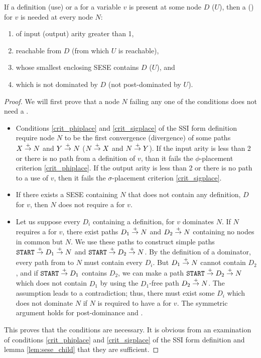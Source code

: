 \documentclass[12pt,titlepage,twoside]{article}
\begin{document}
\begin{lemma}\label{lem:ssi_dom}
If a definition (use) or a \phisigfunction[or]{} for a variable $v$ is
present at some node $D$ (\/$U$), then a \phifunction (\sigfunction) for
$v$ is needed at every node $N$:
\begin{enumerate}
\item of input (output) arity greater than 1,
\item reachable from $D$ (from which $U$ is reachable),
\item whose smallest enclosing SESE contains $D$ (\/$U$), and
\item which is not dominated by $D$ (not post-dominated by $U$).
\end{enumerate}
\end{lemma}
\begin{proof}
We will first prove that a node $N$ failing any one of the conditions does
not need a \phisigfunction[or].
\begin{itemize}
\item Conditions \ref{crit_phiplace} and \ref{crit_sigplace} of the
SSI form definition require node $N$ to be the first convergence
(divergence) of some paths $X \stackrel{+}{\rightarrow} N$ and $Y \stackrel{+}{\rightarrow} N$ ($N
\stackrel{+}{\rightarrow} X$ and $N \stackrel{+}{\rightarrow} Y$).  If the input arity is less than 2
or there is no path from a definition of $v$, than it fails the
$\phi$-placement criterion \ref{crit_phiplace}.  If the output arity
is less than 2 or there is no path to a use of $v$, then it fails the
$\sigma$-placement criterion \ref{crit_sigplace}.
\item If there exists a SESE containing $N$ that does not contain any
definition, \phisigfunction[or]{} $D$ for $v$, then $N$ does not require a
\phisigfunction[or]{} for $v$.
\item Let us suppose every $D_i$ containing a definition,
\phisigfunction[or]{} for $v$ dominates $N$.  If $N$ requires a
\phifunction for $v$,  there exist paths $D_1 \stackrel{+}{\rightarrow} N$ and
$D_2 \stackrel{+}{\rightarrow} N$ containing no nodes in common but $N$.  We use these
paths to construct simple paths $\texttt{START}\stackrel{+}{\rightarrow} D_1 \stackrel{+}{\rightarrow} N$ and
$\texttt{START}\stackrel{+}{\rightarrow} D_2 \stackrel{+}{\rightarrow} N$.  By the definition of a
dominator, every path from  to $N$ must contain every
$D_i$.  But $D_1 \stackrel{+}{\rightarrow} N$ cannot contain $D_2$, and if
$\texttt{START} \stackrel{+}{\rightarrow} D_1$ contains $D_2$, we can make a path
$\texttt{START} \stackrel{+}{\rightarrow} D_2 \stackrel{+}{\rightarrow} N$ which does not contain $D_1$
by using the $D_1$-free path $D_2 \stackrel{+}{\rightarrow} N$.  The assumption leads
to a contradiction; thus, there must exist some $D_i$ which does not
dominate $N$ if $N$ is required to have a \phifunction for $v$.  The
symmetric argument holds for post-dominance and .
\end{itemize}
This proves that the conditions are necessary.  It is obvious from an
examination of conditions \ref{crit_phiplace} and \ref{crit_sigplace}
of the SSI form definition and lemma \ref{lem:sese_child} that they are
sufficient.
\end{proof}
\end{document}
